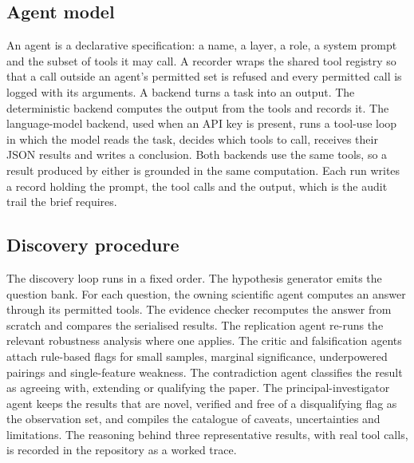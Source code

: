 \documentclass[11pt]{article}
\begin{document}
\subsection{Agent model}
An agent is a declarative specification: a name, a layer, a role, a system prompt and the subset of
tools it may call. A recorder wraps the shared tool registry so that a call outside an agent's
permitted set is refused and every permitted call is logged with its arguments. A backend turns a
task into an output. The deterministic backend computes the output from the tools and records it. The
language-model backend, used when an API key is present, runs a tool-use loop in which the model reads
the task, decides which tools to call, receives their JSON results and writes a conclusion. Both
backends use the same tools, so a result produced by either is grounded in the same computation. Each
run writes a record holding the prompt, the tool calls and the output, which is the audit trail the
brief requires.

\subsection{Discovery procedure}
The discovery loop runs in a fixed order. The hypothesis generator emits the question bank. For each
question, the owning scientific agent computes an answer through its permitted tools. The evidence
checker recomputes the answer from scratch and compares the serialised results. The replication agent
re-runs the relevant robustness analysis where one applies. The critic and falsification agents attach
rule-based flags for small samples, marginal significance, underpowered pairings and single-feature
weakness. The contradiction agent classifies the result as agreeing with, extending or qualifying the
paper. The principal-investigator agent keeps the results that are novel, verified and free of a
disqualifying flag as the observation set, and compiles the catalogue of caveats, uncertainties and
limitations. The reasoning behind three representative results, with real tool calls, is recorded in
the repository as a worked trace.
\end{document}
